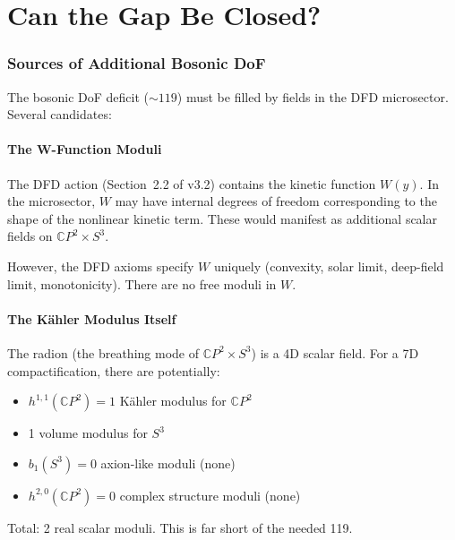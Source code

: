 \documentclass[11pt,a4paper]{article}
\newcommand{\CP}{\mathbb{C}P}
\begin{document}
\part{Can the Gap Be Closed?}
\label{part:gap}

\section{Sources of Additional Bosonic DoF}
\label{sec:extra-bosons}

The bosonic DoF deficit ($\sim 119$) must be filled by fields in the
DFD microsector. Several candidates:

\subsection{The W-Function Moduli}

The DFD action (Section~2.2 of v3.2) contains the kinetic function
$W(y)$. In the microsector, $W$ may have internal degrees of freedom
corresponding to the shape of the nonlinear kinetic term. These would
manifest as additional scalar fields on $\CP^2 \times S^3$.

However, the DFD axioms specify $W$ uniquely (convexity, solar limit,
deep-field limit, monotonicity). There are no free moduli in $W$.

\subsection{The K\"ahler Modulus Itself}

The radion (the breathing mode of $\CP^2 \times S^3$) is a 4D scalar
field. For a 7D compactification, there are potentially:
\begin{itemize}
\item $h^{1,1}(\CP^2) = 1$ K\"ahler modulus for $\CP^2$
\item 1 volume modulus for $S^3$
\item $b_1(S^3) = 0$ axion-like moduli (none)
\item $h^{2,0}(\CP^2) = 0$ complex structure moduli (none)
\end{itemize}

Total: 2 real scalar moduli. This is far short of the needed 119.
\end{document}
